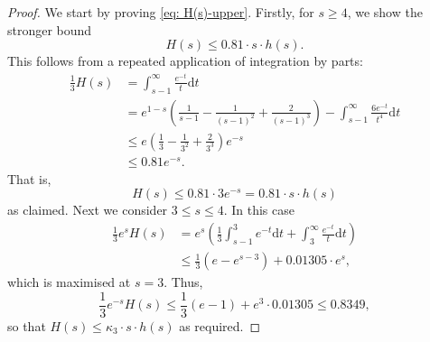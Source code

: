 \documentclass[12pt]{amsart}
\begin{document}
\begin{proof}
We start by proving \eqref{eq: H(s)-upper}. Firstly, for $s \ge 4$, we show the stronger bound 
\begin{equation*}
    H(s)\le 0.81\cdot s\cdot h(s).
\end{equation*}
This follows from a repeated application of integration by parts:
\begin{align*}
    \frac{1}{3}H(s)&=\int_{s-1}^{\infty} \frac{e^{-t}}{t} \mathrm{d}t\\
    &= e^{1-s} \left( \frac{1}{s-1} - \frac{1}{(s-1)^2} + \frac{2}{(s-1)^3} \right) - \int_{s-1}^\infty\frac{6e^{-t}}{t^4}\mathrm{d}t\\ 
    &\le e \left( \frac{1}{3} - \frac{1}{3^2} + \frac{2}{3^3} \right) e^{-s}\\
    &\le 0.81 e^{-s}.
\end{align*}
That is,
\begin{equation*}
    H(s)\le 0.81\cdot 3e^{-s}=0.81\cdot s\cdot h(s)
\end{equation*}
as claimed. Next we consider $3\le s\le 4$. In this case
\begin{align*}
    \frac{1}{3}e^{s}H(s)&=e^{s}\left(\frac{1}{3}\int_{s-1}^3e^{-t}\mathrm{d}t+\int_{3}^\infty\frac{e^{-t}}{t}\mathrm{d}t\right)\\
    &\le \frac{1}{3}\left(e-e^{s-3}\right)+0.01305\cdot e^{s},
\end{align*}
which is maximised at $s=3$. Thus, 
\begin{equation*}
    \frac{1}{3}e^{-s}H(s)\le\frac{1}{3}\left(e-1\right)+e^3\cdot 0.01305\le 0.8349,
\end{equation*}
so that $H(s)\le \kappa_3\cdot s\cdot h(s)$ as required.


\end{proof}
\end{document}
